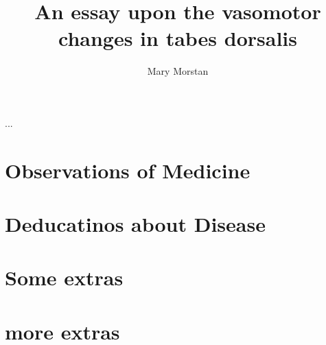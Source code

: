 \documentclass[jdecimal, citestyle=apa, 11pt]{maine-thesis}  %
\title{An essay upon the vasomotor changes in tabes dorsalis}					%
\author{Mary Morstan}					%
\begin{document}
\preliminary
\titlepage

\begin{abstract}
\Blindtext
\end{abstract}

\begin{layabstract}{...}	%
\blindtext
\end{layabstract}

\tableofcontents
\listoftables				%
\listoffigures				%

\mainmatter


\chapter{Observations of Medicine}
\blindtext

\chapter{Deducatinos about Disease}
\blindtext

\appendix					%
\chapter{Some extras}
\blindtext
\chapter{more extras}
\blindtext
\end{document}
